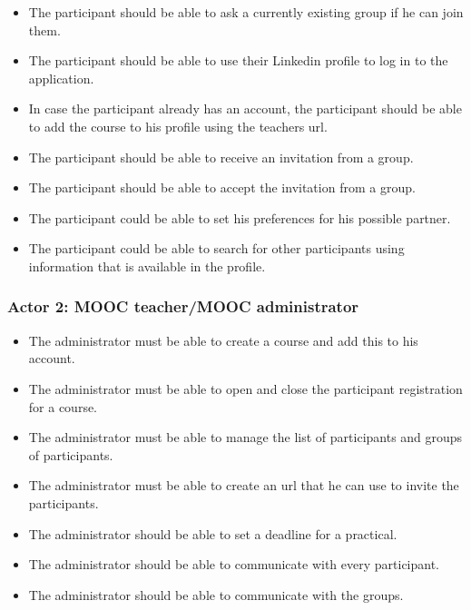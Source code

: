 \begin{itemize}
\item The participant should be able to ask a currently existing group if he can join them.
\item The participant should be able to use their Linkedin profile to log in to the application.
\item In case the participant already has an account, the participant should be able to add the course to his profile using the teachers url.
\item The participant should be able to receive an invitation from a group.
\item The participant should be able to accept the invitation from a group.
\end{itemize}

\begin{itemize}
\item The participant could be able to set his preferences for his possible partner.
\item The participant could be able to search for other participants using information that is available in the profile.
\end{itemize}



\subsubsection*{Actor 2: MOOC teacher/MOOC administrator}
\begin{itemize}
\item The administrator must be able to create a course and add this to his account.
\item The administrator must be able to open and close the participant registration for a course.
\item The administrator must be able to manage the list of participants and groups of participants.
\item The administrator must be able to create an url that he can use to invite the participants.
\end{itemize}

\begin{itemize}
\item The administrator should be able to set a deadline for a practical.
\item The administrator should be able to communicate with every participant.
\item The administrator should be able to communicate with the groups.
\end{itemize}

